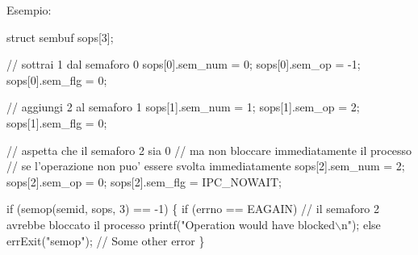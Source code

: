 Esempio\+: 
\begin{DoxyCode}
\textcolor{keyword}{struct }sembuf sops[3];

\textcolor{comment}{// sottrai 1 dal semaforo 0}
sops[0].sem\_num = 0;
sops[0].sem\_op = -1;
sops[0].sem\_flg = 0;

\textcolor{comment}{// aggiungi 2 al semaforo 1}
sops[1].sem\_num = 1;
sops[1].sem\_op = 2;
sops[1].sem\_flg = 0;

\textcolor{comment}{// aspetta che il semaforo 2 sia 0}
\textcolor{comment}{// ma non bloccare immediatamente il processo}
\textcolor{comment}{// se l'operazione non puo' essere svolta immediatamente}
sops[2].sem\_num = 2;
sops[2].sem\_op = 0;
sops[2].sem\_flg = IPC\_NOWAIT;

\textcolor{keywordflow}{if} (semop(semid, sops, 3) == -1) \{
    \textcolor{keywordflow}{if} (errno == EAGAIN)
        \textcolor{comment}{// il semaforo 2 avrebbe bloccato il processo}
        printf(\textcolor{stringliteral}{"Operation would have blocked\(\backslash\)n"});
    \textcolor{keywordflow}{else}
        errExit(\textcolor{stringliteral}{"semop"}); \textcolor{comment}{// Some other error}
\}
\end{DoxyCode}
 